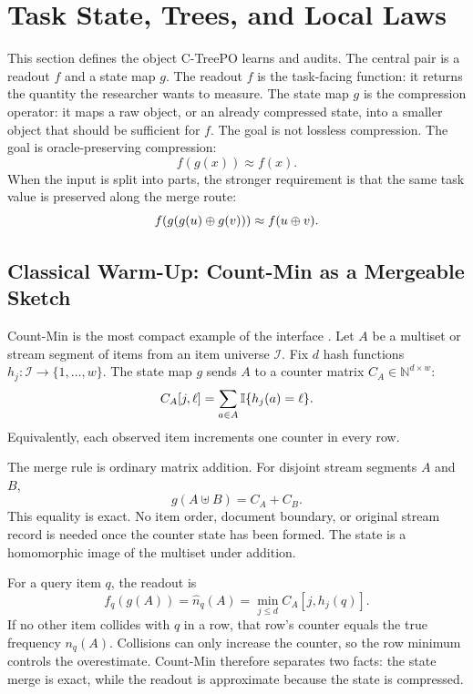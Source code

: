 \section{Task State, Trees, and Local Laws}\label{sec:min-framework}
\label{sec:min-manifesto-state}

This section defines the object C-TreePO learns and audits. The central pair
is a readout $f$ and a state map $g$. The readout $f$ is the task-facing
function: it returns the quantity the researcher wants to measure. The state
map $g$ is the compression operator: it maps a raw object, or an already
compressed state, into a smaller object that should be sufficient for $f$.
The goal is not lossless compression. The goal is oracle-preserving
compression:
\[
  f(g(x)) \approx f(x).
\]
When the input is split into parts, the stronger requirement is that the same
task value is preserved along the merge route:
\[
  f\!\left(g(g(u)\oplus g(v))\right)
  \approx
  f(u\oplus v).
\]

\subsection{Classical Warm-Up: Count-Min as a Mergeable Sketch}

Count-Min is the most compact example of the interface
\citep{CormodeMuthukrishnan2005}. Let $A$ be a multiset or stream segment of
items from an item universe $\mathcal I$. Fix $d$ hash functions
$h_j:\mathcal I\to\{1,\ldots,w\}$. The state map
$g$ sends $A$ to a counter matrix $C_A\in\mathbb N^{d\times w}$:
\[
  C_A[j,\ell]
  =
  \sum_{a\in A}\mathbb{I}\{h_j(a)=\ell\}.
\]
Equivalently, each observed item increments one counter in every row.

The merge rule is ordinary matrix addition. For disjoint stream segments
$A$ and $B$,
\[
  g(A\uplus B)=C_A+C_B.
\]
This equality is exact. No item order, document boundary, or original stream
record is needed once the counter state has been formed. The state is a
homomorphic image of the multiset under addition.

For a query item $q$, the readout is
\[
  f_q(g(A))
  =
  \widehat n_q(A)
  =
  \min_{j\le d} C_A[j,h_j(q)].
\]
If no other item collides with $q$ in a row, that row's counter equals the
true frequency $n_q(A)$. Collisions can only increase the counter, so the row
minimum controls the overestimate. Count-Min therefore separates two facts:
the state merge is exact, while the readout is approximate because the state
is compressed.

